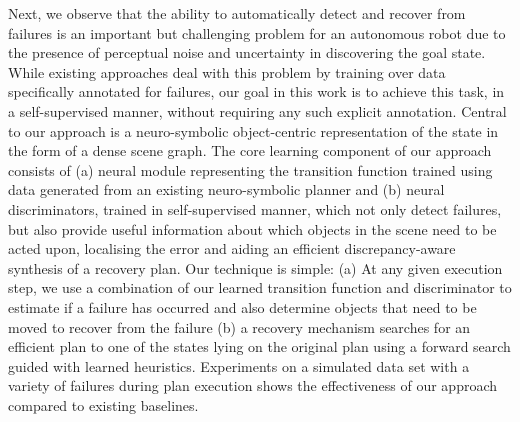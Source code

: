 Next, we observe that the ability to automatically detect and recover from failures is an important but challenging problem for an autonomous robot due to the presence of perceptual noise and uncertainty in discovering the goal state.
%
While existing approaches deal with this problem by training over data specifically annotated for failures, our goal in this work is to achieve this task, in a self-supervised manner, without requiring any such explicit annotation. 
%
Central to our approach is a neuro-symbolic object-centric representation of the state in the form of a dense scene graph. The core learning component of our approach consists of (a) neural module representing the transition function trained using data generated from an existing neuro-symbolic planner and (b) neural discriminators, trained in self-supervised manner, which not only detect failures, but also provide useful information about which objects in the scene need to be acted upon, localising the error and aiding an efficient discrepancy-aware synthesis of a recovery plan.  
%
Our technique is simple: (a) At any given execution step, we use a combination of our learned transition function and discriminator to estimate if a failure has occurred and also determine objects that need to be moved to recover from the failure (b) a recovery mechanism searches for an efficient plan to one of the states lying on the original plan %
using a forward search guided with learned heuristics.  
%
%
Experiments on a simulated data set with a variety of failures during plan execution shows the effectiveness of our approach compared to existing baselines.
